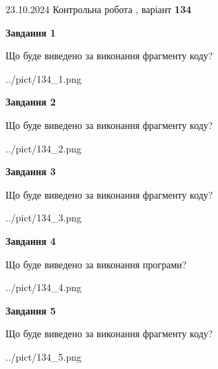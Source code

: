\documentclass[12pt, ukrainian]{article}
\begin{document}
{\Large{23.10.2024 Контрольна робота , варіант  \No \textbf { 134 }\par}}
{
\begin {large}
{\begin {center}\textbf{Завдання 1}\end {center}}

Що буде виведено за виконання фрагменту коду?\par
\begin{center}
	{../pict/134_1.png}
\end{center}
\newpage

{\begin {center}\textbf{Завдання 2}\end {center}}

Що буде виведено за виконання фрагменту коду?\par
\begin{center}
	{../pict/134_2.png}
\end{center}
\newpage

{\begin {center}\textbf{Завдання 3}\end {center}}

Що буде виведено за виконання фрагменту коду?\par
\begin{center}
	{../pict/134_3.png}
\end{center}
\newpage

{\begin {center}\textbf{Завдання 4}\end {center}}

Що буде виведено за виконання програми?\par
\begin{center}
	{../pict/134_4.png}
\end{center}
\newpage

{\begin {center}\textbf{Завдання 5}\end {center}}

Що буде виведено за виконання фрагменту коду?\par
\begin{center}
	{../pict/134_5.png}
\end{center}
\newpage


\end{large}}
\end{document}
